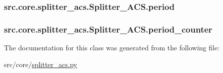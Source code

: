\subsubsection[{period}]{\setlength{\rightskip}{0pt plus 5cm}src.\+core.\+splitter\+\_\+acs.\+Splitter\+\_\+\+A\+C\+S.\+period}\label{classsrc_1_1core_1_1splitter__acs_1_1Splitter__ACS_af9a82fe476fdc7bf419cfa099a839350}
\hypertarget{classsrc_1_1core_1_1splitter__acs_1_1Splitter__ACS_a1bfd9ecd4c14ccbe48ec6055f1cfc45f}{}
\subsubsection[{period\+\_\+counter}]{\setlength{\rightskip}{0pt plus 5cm}src.\+core.\+splitter\+\_\+acs.\+Splitter\+\_\+\+A\+C\+S.\+period\+\_\+counter}\label{classsrc_1_1core_1_1splitter__acs_1_1Splitter__ACS_a1bfd9ecd4c14ccbe48ec6055f1cfc45f}


The documentation for this class was generated from the following file\+:\begin{DoxyCompactItemize}
\item 
src/core/\hyperlink{splitter__acs_8py}{splitter\+\_\+acs.\+py}\end{DoxyCompactItemize}
